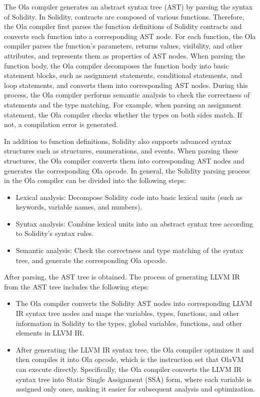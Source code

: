 The Ola compiler generates an abstract syntax tree (AST) by parsing the syntax of Solidity. In Solidity, contracts are composed of various functions. Therefore, the Ola compiler first parses the function definitions of Solidity contracts and converts each function into a corresponding AST node. For each function, the Ola compiler parses the function's parameters, returns values, visibility, and other attributes, and represents them as properties of AST nodes. When parsing the function body, the Ola compiler decomposes the function body into basic statement blocks, such as assignment statements, conditional statements, and loop statements, and converts them into corresponding AST nodes. During this process, the Ola compiler performs semantic analysis to check the correctness of statements and the type matching. For example, when parsing an assignment statement, the Ola compiler checks whether the types on both sides match. If not, a compilation error is generated.

In addition to function definitions, Solidity also supports advanced syntax structures such as structures, enumerations, and events. When parsing these structures, the Ola compiler converts them into corresponding AST nodes and generates the corresponding Ola opcode. In general, the Solidity parsing process in the Ola compiler can be divided into the following steps:

\begin{itemize}
    \item Lexical analysis: Decompose Solidity code into basic lexical units (such as keywords, variable names, and numbers).
    \item Syntax analysis: Combine lexical units into an abstract syntax tree according to Solidity's syntax rules.
    \item Semantic analysis: Check the correctness and type matching of the syntax tree, and generate the corresponding Ola opcode.
\end{itemize}

After parsing, the AST tree is obtained. The process of generating LLVM IR from the AST tree includes the following steps:

\begin{itemize}
    \item The Ola compiler converts the Solidity AST nodes into corresponding LLVM IR syntax tree nodes and maps the variables, types, functions, and other information in Solidity to the types, global variables, functions, and other elements in LLVM IR.
    \item After generating the LLVM IR syntax tree, the Ola compiler optimizes it and then compiles it into Ola opcode, which is the instruction set that OlaVM can execute directly. Specifically, the Ola compiler converts the LLVM IR syntax tree into Static Single Assignment (SSA) form, where each variable is assigned only once, making it easier for subsequent analysis and optimization.
\end{itemize}

